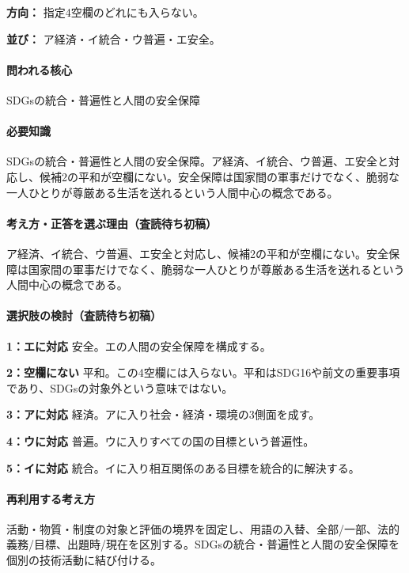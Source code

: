 \noindent\textbf{方向：} 指定4空欄のどれにも入らない。\par

\noindent\textbf{並び：} ア経済・イ統合・ウ普遍・エ安全。\par

\paragraph{問われる核心} SDGsの統合・普遍性と人間の安全保障

\paragraph{必要知識} SDGsの統合・普遍性と人間の安全保障。ア経済、イ統合、ウ普遍、エ安全と対応し、候補2の平和が空欄にない。安全保障は国家間の軍事だけでなく、脆弱な一人ひとりが尊厳ある生活を送れるという人間中心の概念である。

\paragraph{考え方・正答を選ぶ理由（査読待ち初稿）} ア経済、イ統合、ウ普遍、エ安全と対応し、候補2の平和が空欄にない。安全保障は国家間の軍事だけでなく、脆弱な一人ひとりが尊厳ある生活を送れるという人間中心の概念である。

\paragraph{選択肢の検討（査読待ち初稿）}\mbox{}\par

\noindent\textbf{1：エに対応} 安全。エの人間の安全保障を構成する。\par

\noindent\textbf{2：空欄にない} 平和。この4空欄には入らない。平和はSDG16や前文の重要事項であり、SDGsの対象外という意味ではない。\par

\noindent\textbf{3：アに対応} 経済。アに入り社会・経済・環境の3側面を成す。\par

\noindent\textbf{4：ウに対応} 普遍。ウに入りすべての国の目標という普遍性。\par

\noindent\textbf{5：イに対応} 統合。イに入り相互関係のある目標を統合的に解決する。\par

\paragraph{再利用する考え方} 活動・物質・制度の対象と評価の境界を固定し、用語の入替、全部/一部、法的義務/目標、出題時/現在を区別する。SDGsの統合・普遍性と人間の安全保障を個別の技術活動に結び付ける。

